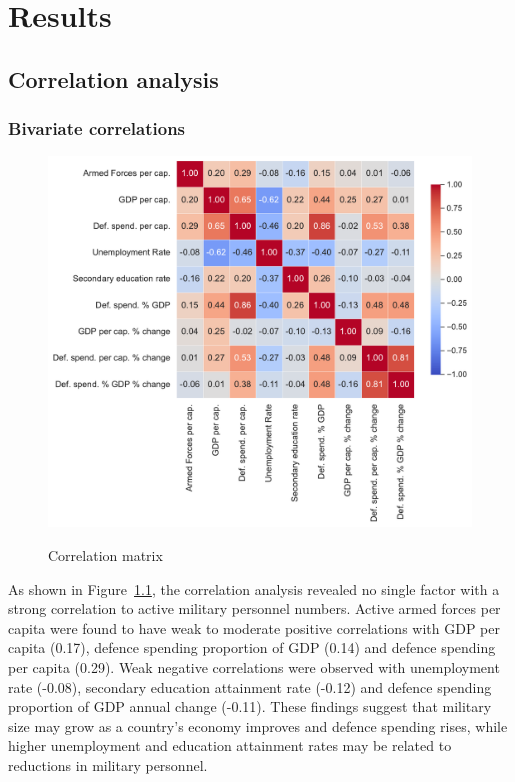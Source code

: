\chapter{Results}

\section{Correlation analysis}

\subsection{Bivariate correlations}

\begin{figure}[htbp]
    \caption{Correlation matrix}
    \centering
    \includegraphics[width=1\textwidth]{images/correlation_heatmap.pdf}
    \label{fig:correlation_heatmap}
\end{figure}

As shown in Figure~\ref{fig:correlation_heatmap}, the correlation analysis revealed no single factor with a strong correlation to active military personnel numbers.
Active armed forces per capita were found to have weak to moderate positive correlations with GDP per 
capita (0.17), defence spending proportion of GDP (0.14) and defence spending per capita (0.29).
Weak negative correlations were observed with unemployment rate
(-0.08), secondary education attainment rate (-0.12) and defence spending proportion of GDP annual 
change (-0.11). These findings suggest that military size may grow as a country's economy improves 
and defence spending rises, while higher unemployment and education attainment rates may be related 
to reductions in military personnel.

